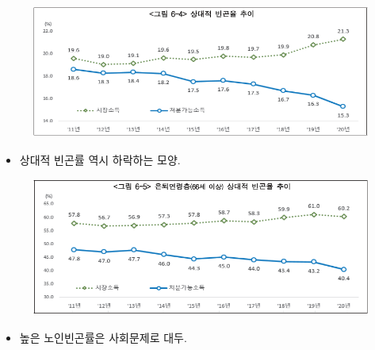 \documentclass[aspectratio=169,xcolor=dvipsnames,handout]{beamer}
\begin{document}
\begin{frame}[<+->]
    \begin{figure}
        \centering
        \includegraphics[width=.9\textwidth]{pic/relpov.png}
    \end{figure}
    \begin{itemize}
        \item 상대적 빈곤률 역시 하락하는 모양.
    \end{itemize}
\end{frame}
\begin{frame}[<+->]
    \begin{figure}
        \centering
        \includegraphics[width=.9\textwidth]{pic/agepov.png}
    \end{figure}
    \begin{itemize}
        \item 높은 노인빈곤률은 사회문제로 대두.
    \end{itemize}
\end{frame}
\end{document}
